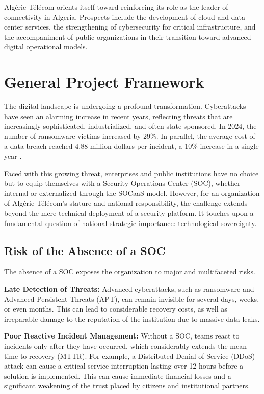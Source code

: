 Algérie Télécom orients itself toward reinforcing its role as the leader of connectivity in Algeria. Prospects include the development of cloud and data center services, the strengthening of cybersecurity for critical infrastructure, and the accompaniment of public organizations in their transition toward advanced digital operational models.

\section{General Project Framework}
\label{sec:cadre}

The digital landscape is undergoing a profound transformation. Cyberattacks have seen an alarming increase in recent years, reflecting threats that are increasingly sophisticated, industrialized, and often state-sponsored. In 2024, the number of ransomware victims increased by 29\%. In parallel, the average cost of a data breach reached 4.88 million dollars per incident, a 10\% increase in a single year \cite{ref-cost-breach} \cite{ref-ransomware}.

Faced with this growing threat, enterprises and public institutions have no choice but to equip themselves with a Security Operations Center (SOC), whether internal or externalized through the SOCaaS model. However, for an organization of Algérie Télécom's stature and national responsibility, the challenge extends beyond the mere technical deployment of a security platform. It touches upon a fundamental question of national strategic importance: technological sovereignty.

\subsection{Risk of the Absence of a SOC}
\label{subsec:risque}

The absence of a SOC exposes the organization to major and multifaceted risks.

\textbf{Late Detection of Threats:} Advanced cyberattacks, such as ransomware and Advanced Persistent Threats (APT), can remain invisible for several days, weeks, or even months. This can lead to considerable recovery costs, as well as irreparable damage to the reputation of the institution due to massive data leaks.

\textbf{Poor Reactive Incident Management:} Without a SOC, teams react to incidents only after they have occurred, which considerably extends the mean time to recovery (MTTR). For example, a Distributed Denial of Service (DDoS) attack can cause a critical service interruption lasting over 12 hours before a solution is implemented. This can cause immediate financial losses and a significant weakening of the trust placed by citizens and institutional partners.

